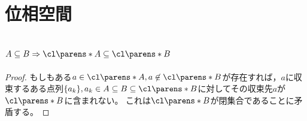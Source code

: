 \chapter{位相空間}
    \section{\texorpdfstring{$A \subseteq B \Rightarrow \cl\parens*{A} \subseteq \cl\parens*{B}$}{A⊆B ⇒ cl(A)⊆cl(B)}}
        \begin{proof}
            もしもある$a\in \cl\parens*{A}, a\not\in\cl\parens*{B}$が存在すれば，$a$に収束するある点列$\{a_k\}, a_k\in A \subseteq B \subseteq \cl\parens*{B}$に対してその収束先$a$が$\cl\parens*{B}$に含まれない。
            これは$\cl\parens*{B}$が閉集合であることに矛盾する。
        \end{proof}